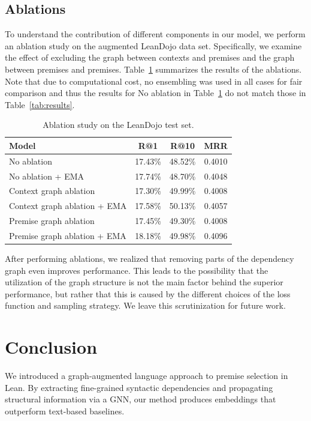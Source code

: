 \subsection{Ablations}
To understand the contribution of different components in our model, we perform an ablation study on the augmented LeanDojo data set. Specifically, we examine the effect of excluding the graph between contexts and premises and the graph between premises and premises. Table~\ref{tab:ablation} summarizes the results of the ablations. Note that due to computational cost, no ensembling was used in all cases for fair comparison and thus the results for No ablation in Table~\ref{tab:ablation} do not match those in Table~\ref{tab:results}.

\begin{table}[H]
\centering

\begin{tabular}{lccc}
\toprule
\textbf{Model} & \textbf{R@1} & \textbf{R@10} & \textbf{MRR} \\
\midrule
No ablation & 17.43\% & 48.52\% & 0.4010 \\
No ablation + EMA & 17.74\% & 48.70\% & 0.4048 \\
\midrule
Context graph ablation & 17.30\% & 49.99\% & 0.4008 \\
Context graph ablation + EMA & 17.58\% & 50.13\% & 0.4057 \\
\midrule
Premise graph ablation & 17.45\% & 49.30\% & 0.4008 \\
Premise graph ablation + EMA & 18.18\% & 49.98\% & 0.4096 \\
\bottomrule
\end{tabular}
\smallskip
\caption{Ablation study on the LeanDojo test set.\label{tab:ablation}
}
\end{table}

After performing ablations, we realized that removing parts of the dependency graph even improves performance. This leads to the possibility that the utilization of the graph structure is not the main factor behind the superior performance, but rather that this is caused by the different choices of the loss function and sampling strategy. We leave this scrutinization for future work.


\section{Conclusion}

We introduced a graph-augmented language approach to premise selection in Lean. By extracting fine-grained syntactic dependencies and propagating structural information via a GNN, our method produces embeddings that outperform text-based baselines. 

